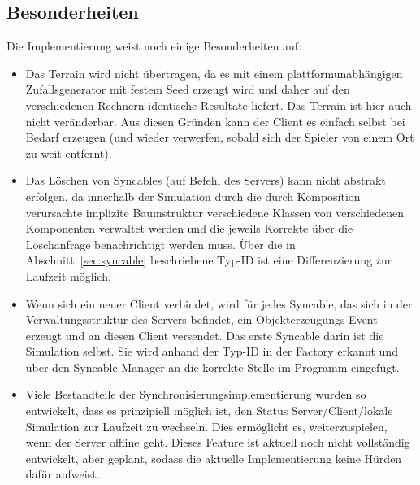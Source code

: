 \subsection{Besonderheiten}
Die Implementierung weist noch einige Besonderheiten auf:%
\begin{itemize}

\item Das Terrain wird nicht übertragen, da es mit einem plattformunabhängigen Zufallsgenerator mit festem Seed erzeugt wird und daher auf den verschiedenen Rechnern identische Resultate liefert. Das Terrain ist hier auch nicht veränderbar. Aus diesen Gründen kann der Client es einfach selbst bei Bedarf erzeugen (und wieder verwerfen, sobald sich der Spieler von einem Ort zu weit entfernt).

\item Das Löschen von Syncables (auf Befehl des Servers) kann nicht abstrakt erfolgen, da innerhalb der Simulation durch die durch Komposition verursachte implizite Baumstruktur verschiedene Klassen von verschiedenen Komponenten verwaltet werden und die jeweils Korrekte über die Löschanfrage benachrichtigt werden muss. Über die in Abschnitt~\ref{sec:syncable} beschriebene Typ-ID ist eine Differenzierung zur Laufzeit möglich.

\item Wenn sich ein neuer Client verbindet, wird für jedes Syncable, das sich in der Verwaltungsstruktur des Servers befindet, ein Objekterzeugungs-Event erzeugt und an diesen Client versendet. Das erste Syncable darin ist die Simulation selbst. Sie wird anhand der Typ-ID in der Factory erkannt und über den Syncable-Manager an die korrekte Stelle im Programm eingefügt.

\item Viele Bestandteile der Synchronisierungsimplementierung wurden so entwickelt, dass es prinzipiell möglich ist, den Status Server/Client/lokale Simulation zur Laufzeit zu wechseln. Dies ermöglicht es, weiterzuspielen, wenn der Server offline geht. Dieses Feature ist aktuell noch nicht vollständig entwickelt, aber geplant, sodass die aktuelle Implementierung keine Hürden dafür aufweist.


\end{itemize}
